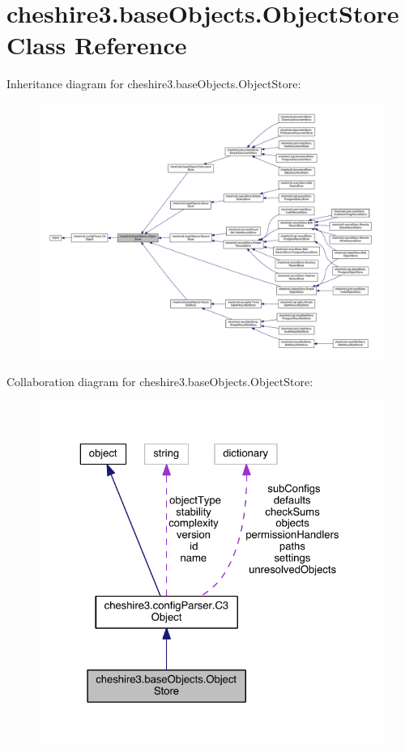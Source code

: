 \hypertarget{classcheshire3_1_1base_objects_1_1_object_store}{\section{cheshire3.\-base\-Objects.\-Object\-Store Class Reference}
\label{classcheshire3_1_1base_objects_1_1_object_store}
}


Inheritance diagram for cheshire3.\-base\-Objects.\-Object\-Store\-:
\nopagebreak
\begin{figure}[H]
\begin{center}
\leavevmode
\includegraphics[width=350pt]{classcheshire3_1_1base_objects_1_1_object_store__inherit__graph}
\end{center}
\end{figure}


Collaboration diagram for cheshire3.\-base\-Objects.\-Object\-Store\-:
\nopagebreak
\begin{figure}[H]
\begin{center}
\leavevmode
\includegraphics[width=325pt]{classcheshire3_1_1base_objects_1_1_object_store__coll__graph}
\end{center}
\end{figure}
